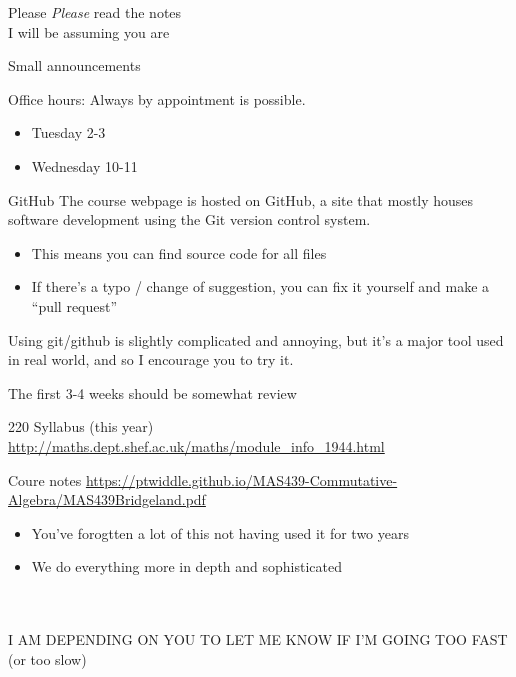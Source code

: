 \documentclass{beamer}
\begin{document}
\begin{frame}[plain,c]

\begin{center}

\Huge

Please \emph{Please} read the notes \\
I will be assuming you are
\end{center}

\end{frame}

\begin{frame}{Small announcements}
  \begin{block}{Office hours:}
Always by appointment is possible.
    \begin{itemize}
    \item Tuesday 2-3
    \item Wednesday 10-11
    \end{itemize}
\end{block}
    \begin{block}{GitHub}
      The course webpage is hosted on GitHub, a site that mostly houses software development using the Git version control system.
      \begin{itemize}
    \item This means you can find source code for all files
    \item If there's a typo / change of suggestion, you can fix it yourself and make a ``pull request''
    \end{itemize}
   Using git/github is slightly complicated and annoying, but it's a major tool used in real world, and so I encourage you to try it.
           \end{block}
\end{frame}

\begin{frame}{The first 3-4 weeks should be somewhat review}

\begin{block}{220 Syllabus (this year)}
  \url{http://maths.dept.shef.ac.uk/maths/module_info_1944.html}
\end{block}

\begin{block}{Coure notes}
  \url{https://ptwiddle.github.io/MAS439-Commutative-Algebra/MAS439Bridgeland.pdf}
  \end{block}
    
\begin{itemize}
\item You've forogtten a lot of this not having used it for two years
\item We do everything more in depth and sophisticated
\end{itemize}
\\~\\
\alert{I AM DEPENDING ON YOU TO LET ME KNOW IF I'M GOING TOO FAST} (or too slow)
\end{frame}
\end{document}
